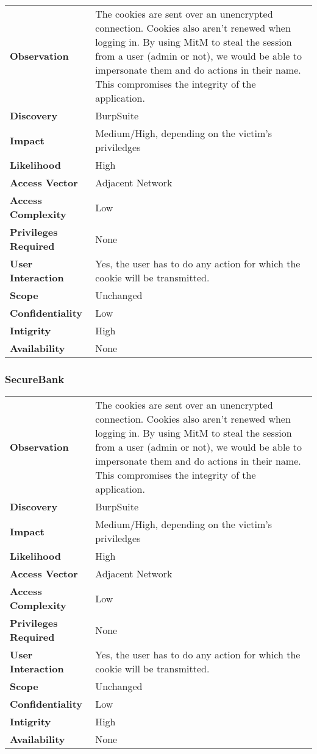 \begin{tabular}{l|p{10cm}}
\textbf{Observation} & The cookies are sent over an unencrypted connection. Cookies also aren't renewed when logging in. By using MitM to steal the session from a user (admin or not), we would be able to impersonate them and do actions in their name. This compromises the integrity of the application. \\
\textbf{Discovery} & BurpSuite \\
\textbf{Impact} & Medium/High, depending on the victim's priviledges \\
\textbf{Likelihood} & High \\
\textbf{Access Vector} & Adjacent Network \\
\textbf{Access Complexity} & Low\\
\textbf{Privileges Required} & None \\
\textbf{User Interaction} & Yes, the user has to do any action for which the cookie will be transmitted. \\
\textbf{Scope} & Unchanged \\
\textbf{Confidentiality} & Low \\
\textbf{Intigrity} & High\\
\textbf{Availability} & None \\
\end{tabular}

\subsubsection*{SecureBank}

\begin{tabular}{l|p{10cm}}
\textbf{Observation} & The cookies are sent over an unencrypted connection. Cookies also aren't renewed when logging in. By using MitM to steal the session from a user (admin or not), we would be able to impersonate them and do actions in their name. This compromises the integrity of the application. \\
\textbf{Discovery} & BurpSuite \\
\textbf{Impact} & Medium/High, depending on the victim's priviledges \\
\textbf{Likelihood} & High \\
\textbf{Access Vector} & Adjacent Network \\
\textbf{Access Complexity} & Low\\
\textbf{Privileges Required} & None \\
\textbf{User Interaction} & Yes, the user has to do any action for which the cookie will be transmitted. \\
\textbf{Scope} & Unchanged \\
\textbf{Confidentiality} & Low \\
\textbf{Intigrity} & High\\
\textbf{Availability} & None \\
\end{tabular}

